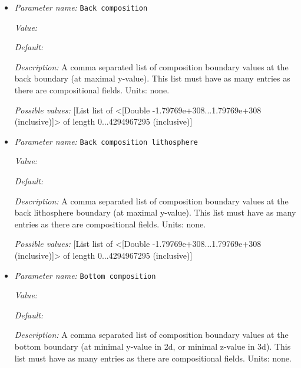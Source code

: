 \begin{itemize}
\item {\it Parameter name:} {\tt Back composition}
\label{parameters:Boundary composition model/Box with lithosphere boundary indicators/Back composition}


{\it Value:} 


{\it Default:} 


{\it Description:} A comma separated list of composition boundary values at the back boundary (at maximal y-value). This list must have as many entries as there are compositional fields. Units: none.


{\it Possible values:} [List list of <[Double -1.79769e+308...1.79769e+308 (inclusive)]> of length 0...4294967295 (inclusive)]
\item {\it Parameter name:} {\tt Back composition lithosphere}
\label{parameters:Boundary composition model/Box with lithosphere boundary indicators/Back composition lithosphere}


{\it Value:} 


{\it Default:} 


{\it Description:} A comma separated list of composition boundary values at the back lithosphere boundary (at maximal y-value). This list must have as many entries as there are compositional fields. Units: none.


{\it Possible values:} [List list of <[Double -1.79769e+308...1.79769e+308 (inclusive)]> of length 0...4294967295 (inclusive)]
\item {\it Parameter name:} {\tt Bottom composition}
\label{parameters:Boundary composition model/Box with lithosphere boundary indicators/Bottom composition}


{\it Value:} 


{\it Default:} 


{\it Description:} A comma separated list of composition boundary values at the bottom boundary (at minimal y-value in 2d, or minimal z-value in 3d). This list must have as many entries as there are compositional fields. Units: none.



\end{itemize}
